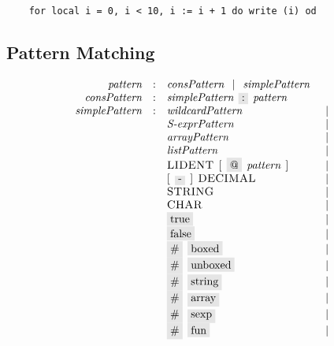 \begin{lstlisting}
    for local i = 0, i < 10, i := i + 1 do write (i) od
\end{lstlisting}

\subsection{Pattern Matching}

\begin{figure}[t]
  \[
    \begin{array}{rcll}
      \defterm{pattern}         & : & \nonterm{consPattern}\alt\nonterm{simplePattern}&\\
      \defterm{consPattern}     & : & \nonterm{simplePattern}\s\term{:}\s\nonterm{pattern}&\\
      \defterm{simplePattern}   & : & \nonterm{wildcardPattern} & \alt\\
                                &   & \nonterm{S-exprPattern} & \alt \\
                                &   & \nonterm{arrayPattern} & \alt \\
                                &   & \nonterm{listPattern} & \alt \\
                                &   & \token{LIDENT}\s[\s\term{@}\s\nonterm{pattern} \s] & \alt \\
                                &   & [\s\term{-}\s]\s\token{DECIMAL}& \alt \\
                                &   & \token{STRING} & \alt \\
                                &   & \token{CHAR} & \alt \\
                                &   & \term{true} & \alt \\
                                &   & \term{false} & \alt \\
                                &   & \term{\#}\s\term{boxed} & \alt \\
                                &   & \term{\#}\s\term{unboxed} & \alt \\
                                &   & \term{\#}\s\term{string} & \alt \\
                                &   & \term{\#}\s\term{array} & \alt \\
                                &   & \term{\#}\s\term{sexp} & \alt \\
                                &   & \term{\#}\s\term{fun} & \alt \\

\end{array}\]
\end{figure}
